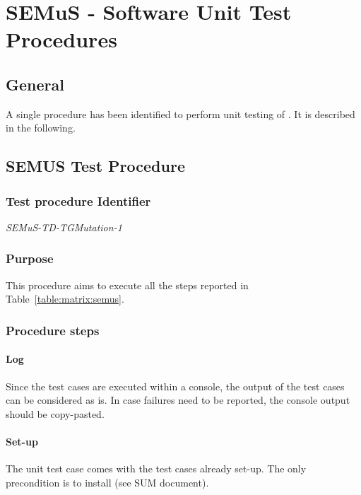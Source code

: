 
\chapter{SEMuS - Software Unit Test Procedures}
\label{ch:semus:test}

\section{General}

A single procedure has been identified to perform unit testing of \SEMUS. It is described in the following.

\section{SEMUS Test Procedure}

\subsection{Test procedure Identifier}

\emph{SEMuS-TD-TGMutation-1}


\subsection{Purpose}

This procedure aims to execute all the steps reported in Table~\ref{table:matrix:semus}.

\subsection{Procedure steps}

\subsubsection{Log}
Since the test cases are executed within a console, the output of the test cases can be considered as is.
In case failures need to be reported, the console output should be copy-pasted.
\subsubsection{Set-up}
The unit test case comes with the test cases already set-up. The only precondition is to install \SEMUS (see SUM document).
